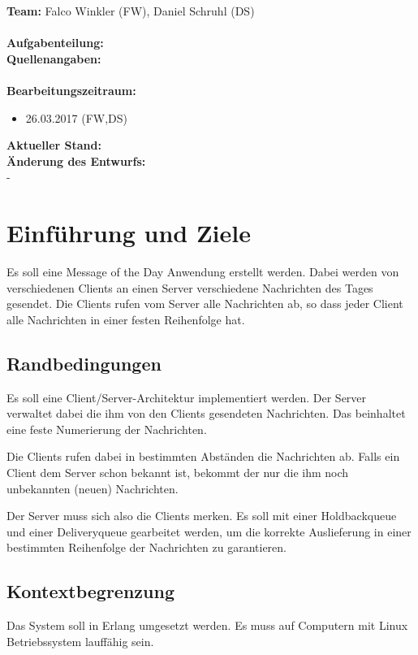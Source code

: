 \documentclass{article}
\begin{document}
\textbf{Team:} Falco Winkler (FW), Daniel Schruhl (DS)\\
\\
\textbf{Aufgabenteilung:}\\

\textbf{Quellenangaben:}\\
\\
\textbf{Bearbeitungszeitraum:}
\begin{itemize}
	\item 26.03.2017 (FW,DS)
\end{itemize}

\textbf{Aktueller Stand:}\\

\textbf{Änderung des Entwurfs:}\\
-

\newpage
\tableofcontents 
\newpage

\section{Einführung und Ziele}
Es soll eine Message of the Day Anwendung erstellt werden. Dabei werden von verschiedenen Clients an einen Server verschiedene Nachrichten des Tages gesendet. Die Clients rufen vom Server alle Nachrichten ab, so dass jeder Client alle Nachrichten in einer festen Reihenfolge hat.

\subsection{Randbedingungen}
Es soll eine Client/Server-Architektur implementiert werden.
Der Server verwaltet dabei die ihm von den Clients gesendeten Nachrichten. Das beinhaltet eine feste Numerierung der Nachrichten.

Die Clients rufen dabei in bestimmten Abständen die Nachrichten ab. Falls ein Client dem Server schon bekannt ist, bekommt der nur die ihm noch unbekannten (neuen) Nachrichten.

Der Server muss sich also die Clients merken. Es soll mit einer Holdbackqueue und einer Deliveryqueue gearbeitet werden, um die korrekte Auslieferung in einer bestimmten Reihenfolge der Nachrichten zu garantieren.

\subsection{Kontextbegrenzung}
Das System soll in Erlang umgesetzt werden. Es muss auf Computern mit Linux Betriebssystem lauffähig sein.
\end{document}

